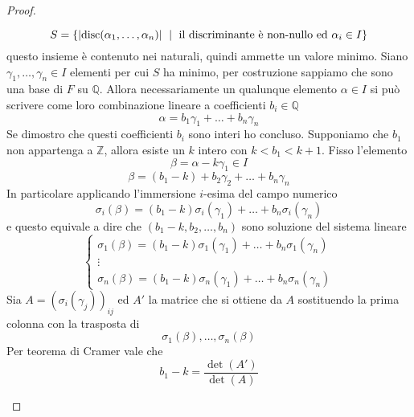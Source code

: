 \begin{proof}
\begin{enumerate}
\begin{equation*}
		S = \left\{\left|\operatorname{disc}(\alpha_1,\dots,\alpha_n)\right| \ \mid \ \text{il discriminante è non-nullo ed $\alpha_i\in I$} \right\}
		\end{equation*}
		questo insieme è contenuto nei naturali, quindi ammette un valore minimo. Siano $\gamma_1,\dots,\gamma_n\in I$ elementi per cui $S$ ha minimo, per costruzione sappiamo che sono una base di $F$ su $\mathbb{Q}$. Allora necessariamente un qualunque elemento $\alpha\in I$ si può scrivere come loro combinazione lineare a coefficienti $b_i\in\mathbb{Q}$
		\begin{equation*}
		\alpha=b_1\gamma_1+\dots+b_n\gamma_n
		\end{equation*}
		Se dimostro che questi coefficienti $b_i$ sono interi ho concluso. Supponiamo che $b_1$ non appartenga a $\mathbb{Z}$, allora esiste un $k$ intero con $k<b_1<k+1$. Fisso l'elemento
		\begin{equation*}
		\beta=\alpha-k\gamma_1\in I
		\end{equation*}
		\begin{equation*}
		\beta=(b_1-k)+b_2\gamma_2+\dots+b_n\gamma_n
		\end{equation*}
		In particolare applicando l'immersione $i$-esima del campo numerico
		\begin{equation*}
		\sigma_i(\beta)=(b_1-k)\sigma_i(\gamma_1)+\dots+b_n\sigma_i(\gamma_n)
		\end{equation*}
		e questo equivale a dire che $(b_1-k,b_2,\dots,b_n)$ sono soluzione del sistema lineare
		\begin{equation*}
		\begin{cases}
		\sigma_1(\beta)=(b_1-k)\sigma_1(\gamma_1)+\dots+b_n\sigma_1(\gamma_n)\\
		\vdots\\
		\sigma_n(\beta)=(b_1-k)\sigma_n(\gamma_1)+\dots+b_n\sigma_n(\gamma_n)
		\end{cases}
		\end{equation*}
		Sia $A=\left(\sigma_i(\gamma_j)\right)_{ij}$ ed $A'$ la matrice che si ottiene da $A$ sostituendo la prima colonna con la trasposta di 
		\begin{equation*}
		\sigma_1(\beta),\dots,\sigma_n(\beta)
		\end{equation*}
		Per teorema di Cramer vale che 
		\begin{equation*}
		b_1-k=\frac{\det(A')}{\det(A)}
		\end{equation*}
		\begin{equation*}

\end{equation*}
\end{enumerate}
\end{proof}
